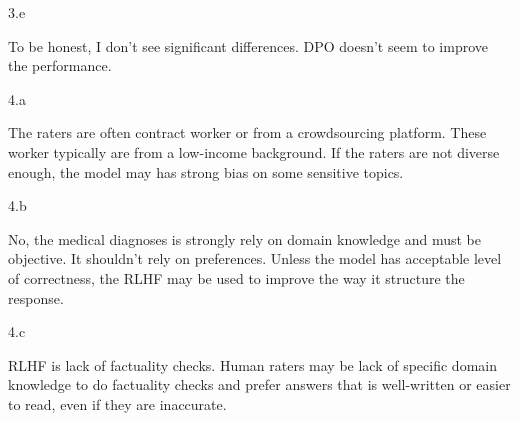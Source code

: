 \LARGE
3.e
\normalsize

\begin{answer}
  To be honest, I don't see significant differences. DPO doesn't seem to improve the performance.
\end{answer}
\clearpage

\LARGE
4.a
\normalsize

\begin{answer}
  The raters are often contract worker or from a crowdsourcing
  platform. These worker typically are from a low-income background.
  If the raters are not diverse enough, the model may has strong bias
  on some sensitive topics.
\end{answer}
\clearpage

\LARGE
4.b
\normalsize

\begin{answer}
  No, the medical diagnoses is strongly rely on domain
  knowledge and must be objective. It shouldn't rely on
  preferences. Unless the model has acceptable level of
  correctness, the RLHF may be used to improve the way
  it structure the response.
\end{answer}
\clearpage

\LARGE
4.c
\normalsize

\begin{answer}
  RLHF is lack of factuality checks. Human raters may be
  lack of specific domain knowledge to do factuality checks
  and prefer answers that is well-written or easier to read,
  even if they are inaccurate.
\end{answer}
\clearpage




